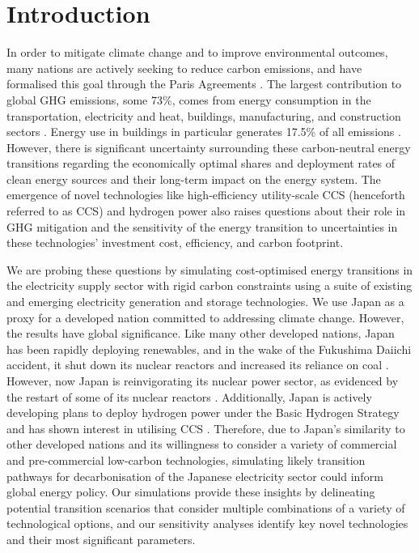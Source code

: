\section{Introduction} \label{Introduction}
In order to mitigate climate change and to improve environmental outcomes, many nations are actively seeking to reduce carbon emissions, and have formalised this goal through the Paris Agreements \cite{united_nations_framework_convention_on_climate_change_unfccc_submission_2015}. The largest contribution to global \gls{GHG} emissions, some 73\%, comes from energy consumption in the transportation, electricity and heat, buildings, manufacturing, and construction sectors \cite{ge_4_2020}. Energy use in buildings in particular generates 17.5\% of all emissions \cite{ritchie_emissions_2021}. However, there is significant uncertainty surrounding these carbon-neutral energy transitions regarding the economically optimal shares and deployment rates of clean energy sources and their long-term impact on the energy system. The emergence of novel technologies like high-efficiency utility-scale \gls{CCS} (henceforth referred to as \gls{CCS}) and hydrogen power also raises questions about their role in \gls{GHG} mitigation and the sensitivity of the energy transition to uncertainties in these technologies' investment cost, efficiency, and carbon footprint.

We are probing these questions by simulating cost-optimised energy transitions in the electricity supply sector with rigid carbon constraints using a suite of existing and emerging electricity generation and storage technologies. We use Japan as a proxy for a developed nation committed to addressing climate change. However, the results have global significance. Like many other developed nations, Japan has been rapidly deploying renewables, and in the wake of the Fukushima Daiichi accident, it shut down its nuclear reactors and increased its reliance on coal \cite{international_energy_agency_latest_2019, noauthor_electricity_2019}. However, now Japan is reinvigorating its nuclear power sector, as evidenced by the restart of some of its nuclear reactors \cite{iaea_pris_nodate}. Additionally, Japan is actively developing plans to deploy hydrogen power under the Basic Hydrogen Strategy \cite{noauthor_basic_2017} and has shown interest in utilising \gls{CCS} \cite{meti_report_2020}. Therefore, due to Japan's similarity to other developed nations and its willingness to consider a variety of commercial and pre-commercial low-carbon technologies, simulating likely transition pathways for decarbonisation of the Japanese electricity sector could inform global energy policy. Our simulations provide these insights by delineating potential transition scenarios that consider multiple combinations of a variety of technological options, and our sensitivity analyses identify key novel technologies and their most significant parameters.

